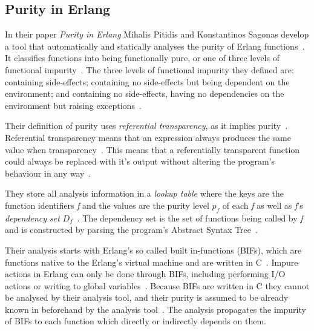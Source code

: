 \documentclass[a4paper,12pt]{article}
\begin{document}
\subsection{Purity in Erlang} \label{sub:Purity-in-Erlang}
In their paper \textit{Purity in Erlang} Mihalis Pitidis and Konstantinos Sagonas develop a tool that automatically and statically analyses the purity of Erlang functions~\cite{pitidis2010purity}. It classifies functions into being functionally pure, or one of three levels of functional impurity~\cite{pitidis2010purity}.
The three levels of functional impurity they defined are: containing side-effects; containing no side-effects but being dependent on the environment; and containing no side-effects, having no dependencies on the environment but raising exceptions~\cite{pitidis2010purity}.

Their definition of purity uses \textit{referential transparency}, as it implies purity~\cite{pitidis2010purity}. Referential transparency means that an expression always produces the same value when transparency~\cite{pitidis2010purity}. This means that a referentially transparent function could always be replaced with it's output without altering the program's behaviour in any way~\cite{pitidis2010purity}.

They store all analysis information in a \textit{lookup table} where the keys are the function identifiers \textit{f} and the values are the purity level \textit{$p_f$} of each \textit{f} as well as \textit{f}'s \textit{dependency set} $D_f$~\cite{pitidis2010purity}. The dependency set is the set of functions being called by \textit{f} and is constructed by parsing the program's Abstract Syntax Tree~\cite{pitidis2010purity}.

Their analysis starts with Erlang's so called built in-functions (BIFs), which are functions native to the Erlang's virtual machine and are written in C~\cite{pitidis2010purity}. Impure actions in Erlang can only be done through BIFs, including performing I/O actions or writing to global variables~\cite{kostis-email}. Because BIFs are written in C they cannot be analysed by their analysis tool, and their purity is assumed to be already known in beforehand by the analysis tool~\cite{pitidis2010purity}. The analysis propagates the impurity of BIFs to each function which directly or indirectly depends on them.
\end{document}
